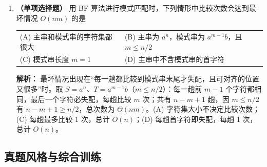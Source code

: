 \begin{enumerate}
\item \textbf{（单项选择题）} 用 BF 算法进行模式匹配时，下列情形中比较次数会达到最坏情况 $O(nm)$ 的是
\begin{center}
\begin{tabular}{ll}
(A) 主串和模式串的字符集都很大 & (B) 主串为 $a^n$，模式串为 $a^{m-1}b$，且 $m\leqslant n/2$ \\[6pt]
(C) 模式串长度 $m=1$ & (D) 主串中不含模式串的首字符
\end{tabular}
\end{center}

\ifshowsolutions\par\noindent\textbf{解析：} 最坏情况出现在“每一趟都比较到模式串末尾才失配，且可对齐的位置又很多”时。取 $S=a^n$、$T=a^{m-1}b$（$m\leqslant n/2$）：每一趟前 $m-1$ 个字符都相同，最后一个字符必失配，每趟比较 $m$ 次；共有 $n-m+1$ 趟，因 $m\leqslant n/2$ 有 $n-m+1\geqslant n/2$，总次数为 $\Theta(nm)$。(A) 字符集大小不决定比较次数；(C) 每趟最多比较 1 次，总计 $O(n)$；(D) 每趟首字符即失配，每趟 1 次，总计 $O(n)$。\else \answerarea \fi

\end{enumerate}

\subsection{真题风格与综合训练}

